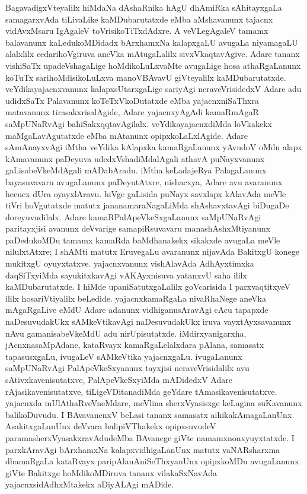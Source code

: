 BagavadigxVteyalilx hiMdaNa dAshaRnika hAgU dhAmiRka sAhitayxgaLa samagarx\-vAda tiLivaLike kaMDubarutatxde eMba aMshavanunx tajacnx vidAvxMsaru IgAgaleV toVrisi\-koTiTx\-dAdxre. A veVLegAgaleV tamamx balavanunx kaLedukoMDidadx bArxhamxNa kalapxgaLU avugaLa niyamagaLU alalxlilx cedarihoVgiruva aneVka mAtugaLalilx sivxVkaqtavAgive. Adare tananx vishiSaTx upadeVshagaLige hoMdikoLuLxvaMte avugaLige hosa athaRgaLanunx koTuTx sarihoMdisikoLuLxva manoVBAvavU giVteyalilx kaMDubarutatxde. veYdikayajacnxvanunx kalapxsUtarxgaLige sariyAgi neraveVrisidedxV Adare adu udidxSaTx Palavanunx koTeTxVkoDu\-tatxde eMba yajacnxniSaThxra matavanunx tirasakxrisalAgide, Adare yajacnxyAgAdi kamaR\-mAgaR saMpUNaRvAgi bahiSakxqqtavAgilalx. veYdikayajacnxdiMda loVkakekx maMgaLavAgutatxde eMba mAtanunx opipxkoLaLxlAgide. Adare sAmAnayxvAgi iMtha veYdika kAlapxka kamaR\-gaLanunx yAvudoV oMdu alapx kAmavanunx paDeyuva udedxVshadiMdalAgali athavA puNayx\-vanunx gaLisabeVkeMdAgali mADabAradu. iMtha keLadajeRya PalagaLanunx bayasu\-vavaru avugaLanunx paDeyutAtxre, nishacxya, Adare avu avaranunx hecucx dUra oyayx\-lAravu. hiVge gaLisida puNayx savxlapx kAlavAda meVle tiVri hoVgutatxde matutx janana\-maraNagaLiMda shAshavxtavAgi biDugaDe doreyuvudilalx. Adare kamaRPalApeVkeSx\-gaLanunx saMpUNaR\-vAgi paritayxjisi avanunx deVvarige samapiRsuvavaru manashAshxMtiyanunx paDedukoMDu tamamx kamaRda baMdhanakekx sikakxde avugaLa meVle nilulxtAtxre; I shAMti matutx EruvegaLu ava\-ranunx nijavAda BakitxgU konege mukitxgU oyuyxtatxve. yajacnxvanunx vishAla\-vAda AdhAyxtimxka daqSiTxyiMda sayukitxkavAgi vAKAyxnisuva yatanxvU saha ililx kaMDubarutatxde. I hiMde upaniSatutxgaLalilx goVcarisida I parxvaqtitxyeV ililx hosariVtiyalilx beLedide. yajacnx\-kamaRgaLa nivaRhaNege aneVka mAgaRgaLive eMdU Adare adanunx vidhiganusAravAgi cAcu tapapxde naDesuvudakUkx sAMkeVtikavAgi naDesuvudakUkx iruva vayxtAyxsavanunx nAvu gamanisabeVkeMdU adu nirUpisutatxde. iMdirxyanigarxha, jAcnxnasaMpAdane, kataRvayx kamaRgaLelalxdara pAlana, samasatx tapasusxgaLu, ivugaLeV sAMkeVtika yajacnxgaLu. ivu\-gaLanunx saMpUNaRvAgi PalApeVkeSxyanunx tayxjisi neraveVrisidalilx avu sAtivxkavenisu\-tatxve, PalApeVkeSxyiMda mADidedxV Adare rAjasikavenisutatxve, tiLigeVDitanadiMda geYdare tAmasikavenisutatxve. yajacnxda mUlAthaRveVneMdare, meVlina sherxVyasisxge keLagina suKa\-vanunx balikoDuvudu. I BAvavanenxV beLasi tananx samasatx aihika\-kAmagaLanUnx Asakitx\-gaLanUnx deVvara balipiVThakekx opipxsuvudeV paramasherxVyasakxravAdudeMba BAvanege giVte namamxnonxyuyxtatxde. I parxkAravAgi bArxhamxNa kalapxvidhigaLanUnx matutx vaNARsharxma dhamaR\-gaLa kataRvayx paripAlanAniSeThxyanUnx opipxkoMDu avugaLanunx giVte Bakitxge hoMdi\-koMDiruva tananx vilakaSxNavAda yajacnxsidAdhxMtakekx aDiyALAgi mADide.

